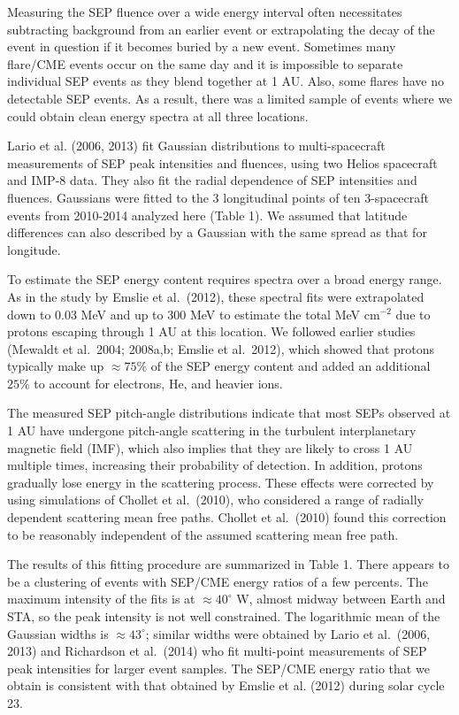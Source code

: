\documentclass[10pt,preprint]{aastex}  %
\begin{document}
Measuring the SEP fluence over a wide energy interval often 
necessitates subtracting background from an earlier event or 
extrapolating the decay of the event in question if it becomes 
buried by a new event. Sometimes many flare/CME events occur 
on the same day and it is impossible to separate individual 
SEP events as they blend together at 1 AU. Also, some flares
have no detectable SEP events. As a result, there 
was a limited sample of events where we could obtain clean 
energy spectra at all three locations. 

Lario et al. (2006, 2013) fit Gaussian distributions to multi-spacecraft 
measurements of SEP peak intensities and fluences, using
two Helios spacecraft and IMP-8 data. They also fit the radial 
dependence of SEP intensities and fluences. Gaussians were fitted to the 
3 longitudinal points of ten 3-spacecraft events from 2010-2014
analyzed here (Table 1). 
We assumed that latitude differences can also described by a Gaussian 
with the same spread as that for longitude.

To estimate the SEP energy content requires spectra over a broad 
energy range. As in the study by Emslie et al.~(2012), these 
spectral fits were extrapolated down to 0.03 MeV and up to 300 MeV 
to estimate the total MeV cm$^{-2}$ due to protons escaping through 1 AU 
at this location. We followed earlier studies 
(Mewaldt et al.~2004; 2008a,b; Emslie et al.~2012), 
which showed that protons typically make up 
$\approx 75\%$ of the SEP energy content and added an additional 
$25\%$ to account for electrons, He, and heavier ions. 

The measured SEP pitch-angle distributions indicate that most SEPs 
observed at 1 AU have undergone pitch-angle scattering in the 
turbulent interplanetary magnetic field (IMF), which also implies 
that they are likely to cross 1 AU multiple times, increasing their 
probability of detection.  In addition, protons gradually lose 
energy in the scattering process. These effects were corrected 
by using simulations of Chollet et al.~(2010), who considered 
a range of radially dependent scattering mean free paths. 
Chollet et al.~(2010) found this correction to be reasonably 
independent of the assumed scattering mean free path.

The results of this fitting procedure are summarized in Table 1. 
There appears to be a clustering of events with SEP/CME energy ratios 
of a few percents.  The maximum intensity of the fits is at 
$\approx 40^\circ$ W, almost midway between Earth and STA, so 
the peak intensity is not well constrained. The logarithmic mean 
of the Gaussian widths is $\approx 43^\circ$; similar widths were 
obtained by Lario et al.~(2006, 2013) and Richardson et al.~(2014) 
who fit multi-point measurements of SEP peak intensities for 
larger event samples. The SEP/CME energy ratio that we obtain 
is consistent with that obtained by Emslie et al. (2012) during 
solar cycle 23.  
\end{document}
